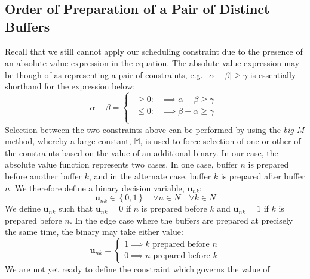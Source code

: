 \subsection{Order of Preparation of a Pair of Distinct Buffers}
\label{SS.constr8}

Recall that we still cannot apply our scheduling constraint due to the presence
of an absolute value expression in the equation.
The absolute value expression may be though of as representing a pair of
constraints, e.g.\ $ \lvert \alpha - \beta \rvert \ge \gamma $ is essentially 
shorthand for the expression below:
\begin{equation}
    \alpha - \beta = 
    \begin{cases}
        \begin{alignedat}{2}
            \ge 0: &\implies \alpha {}-{} \beta {}\ge{} \gamma\\
            \le 0: &\implies \beta {}-{} \alpha {}\ge{} \gamma\\
        \end{alignedat}
    \end{cases}
\end{equation}
Selection between the two constraints above can be performed by using the 
\emph{big-M} method, whereby a large constant, $ \mathbb{M} $, is used to force
selection of one or other of the constraints
based on the value of an additional binary.
In our case, the absolute value function represents two cases.
In one case, buffer $n$ is prepared before another buffer $k$, and in the
alternate case, buffer $k$ is prepared after buffer $n$.
We therefore define a binary decision variable, $\boldsymbol{u}_{nk}$:
\begin{equation}
    \boldsymbol{u}_{nk} \in \left\{ 0, 1 \right\} \quad \forall n \in N \quad
    \forall k \in N
    \label{eq.u}
\end{equation}
We define $\boldsymbol{u}_{nk}$ such that $ \boldsymbol{u}_{nk} = 0 $ if $n$ is
prepared before $k$ and $ \boldsymbol{u}_{nk} = 1 $ if $k$ is prepared before
$n$.
In the edge case where the buffers are prepared at precisely the same time,
the binary may take either value:
\begin{equation}
    \boldsymbol{u}_{nk} =
    \begin{cases}
        1 \implies k \text{ prepared before } n\\
        0 \implies n \text{ prepared before } k
    \end{cases}
\end{equation}
We are not yet ready to define the constraint which governs the value of
